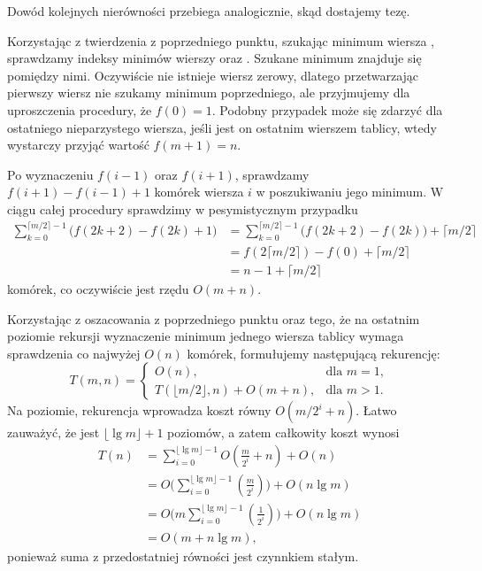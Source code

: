 Dowód kolejnych nierówności przebiega analogicznie, skąd dostajemy tezę.

\subexercise{} %
Korzystając z twierdzenia z poprzedniego punktu, szukając minimum wiersza , sprawdzamy indeksy minimów wierszy  oraz . Szukane minimum znajduje się pomiędzy nimi. Oczywiście nie istnieje wiersz zerowy, dlatego przetwarzając pierwszy wiersz nie szukamy minimum poprzedniego, ale przyjmujemy dla uproszczenia procedury, że $f(0)=1$. Podobny przypadek może się zdarzyć dla ostatniego nieparzystego wiersza, jeśli jest on ostatnim wierszem tablicy, wtedy wystarczy przyjąć wartość $f(m+1)=n$.

Po wyznaczeniu $f(i-1)$ oraz $f(i+1)$, sprawdzamy $f(i+1)-f(i-1)+1$ komórek wiersza $i$ w poszukiwaniu jego minimum. W ciągu całej procedury sprawdzimy w pesymistycznym przypadku
\begin{align*}
	\sum_{k=0}^{\lceil m/2\rceil-1}\bigl(f(2k+2)-f(2k)+1\bigr) &= \sum_{k=0}^{\lceil m/2\rceil-1}\bigl(f(2k+2)-f(2k))+\lceil m/2\rceil \\
	&= f(2\lceil m/2\rceil)-f(0)+\lceil m/2\rceil \\[2mm]
	&= n-1+\lceil m/2\rceil
\end{align*}
komórek, co oczywiście jest rzędu $O(m+n)$.

\subexercise{} %
Korzystając z oszacowania z poprzedniego punktu oraz tego, że na ostatnim poziomie rekursji wyznaczenie minimum jednego wiersza tablicy wymaga sprawdzenia co najwyżej $O(n)$ komórek, formułujemy następującą rekurencję:
\[
	T(m,n) =
	\begin{cases}
		O(n), & \text{dla $m=1$}, \\
		T(\lfloor m/2\rfloor,n)+O(m+n), & \text{dla $m>1$}.
	\end{cases}
\]
Na  poziomie, rekurencja wprowadza koszt równy $O(m/2^i+n)$. Łatwo zauważyć, że jest $\lfloor\lg m\rfloor+1$ poziomów, a zatem całkowity koszt wynosi
\begin{align*}
	T(n) &= \sum_{i=0}^{\lfloor\lg m\rfloor-1}O\left(\frac{m}{2^i}+n\right)+O(n) \\
	&= O\biggl(\sum_{i=0}^{\lfloor\lg m\rfloor-1}\left(\frac{m}{2^i}\right)\biggr)+O(n\lg m) \\
	&= O\biggl(m\sum_{i=0}^{\lfloor\lg m\rfloor-1}\left(\frac{1}{2^i}\right)\biggr)+O(n\lg m) \\
	&= O(m+n\lg m),
\end{align*}
ponieważ suma z przedostatniej równości jest czynnkiem stałym.

\endinput

